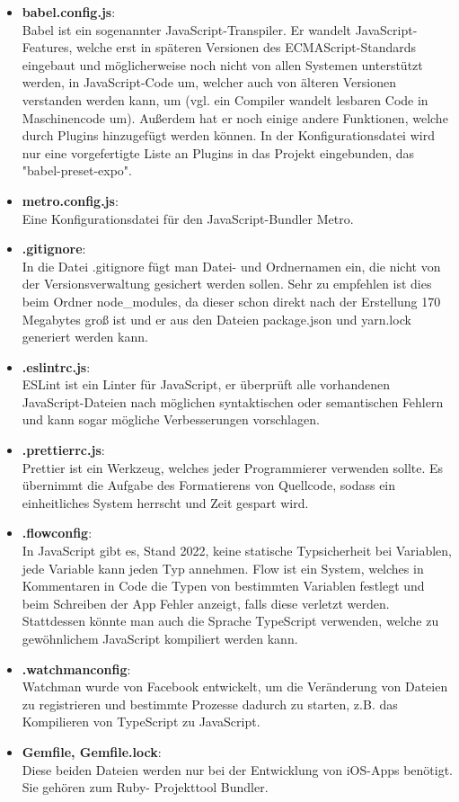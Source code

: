 \begin{itemize}
\item \textbf{babel.config.js}:\\
Babel ist ein sogenannter JavaScript-Transpiler. Er wandelt JavaScript-Features, welche erst in
späteren Versionen des ECMAScript-Standards eingebaut und möglicherweise noch nicht von allen
Systemen unterstützt werden, in JavaScript-Code um, welcher auch von älteren Versionen verstanden
werden kann, um (vgl. ein Compiler wandelt lesbaren Code in Maschinencode um). Außerdem hat er noch
einige andere Funktionen, welche durch Plugins hinzugefügt werden können. In der Konfigurationsdatei
wird nur eine vorgefertigte Liste an Plugins in das Projekt eingebunden, das "babel-preset-expo".

\item \textbf{metro.config.js}:\\
Eine Konfigurationsdatei für den JavaScript-Bundler Metro.

\item \textbf{.gitignore}:\\
In die Datei .gitignore fügt man Datei- und Ordnernamen ein, die nicht von der Versionsverwaltung
gesichert werden sollen. Sehr zu empfehlen ist dies beim Ordner node\_modules, da dieser schon
direkt nach der Erstellung 170 Megabytes groß ist und er aus den Dateien package.json und yarn.lock
generiert werden kann.

\item \textbf{.eslintrc.js}:\\
ESLint ist ein Linter für JavaScript, er überprüft alle vorhandenen JavaScript-Dateien nach
möglichen syntaktischen oder semantischen Fehlern und kann sogar mögliche Verbesserungen vorschlagen.

\item \textbf{.prettierrc.js}:\\
Prettier ist ein Werkzeug, welches jeder Programmierer verwenden sollte. Es übernimmt die Aufgabe
des Formatierens von Quellcode, sodass ein einheitliches System herrscht und Zeit gespart wird.

\item \textbf{.flowconfig}:\\
In JavaScript gibt es, Stand 2022, keine statische Typsicherheit bei Variablen, jede Variable kann
jeden Typ annehmen. Flow ist ein System, welches in Kommentaren in Code die Typen von bestimmten
Variablen festlegt und beim Schreiben der App Fehler anzeigt, falls diese verletzt werden.
Stattdessen könnte man auch die Sprache TypeScript verwenden, welche zu gewöhnlichem JavaScript
kompiliert werden kann.

\item \textbf{.watchmanconfig}:\\
Watchman wurde von Facebook entwickelt, um die Veränderung von Dateien zu registrieren und bestimmte
Prozesse dadurch zu starten, z.B. das Kompilieren von TypeScript zu JavaScript.

\item \textbf{Gemfile, Gemfile.lock}:\\
Diese beiden Dateien werden nur bei der Entwicklung von iOS-Apps benötigt. Sie gehören zum Ruby-
Projekttool Bundler.

\end{itemize}
